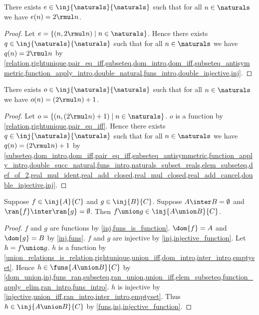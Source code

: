 \begin{lemma}\label{even_code_injection}
    There exists $e\in\inj{\naturals}{\naturals}$ such that
    for all $n\in\naturals$ we have $e(n)=2\rmul n$.
\end{lemma}
\begin{proof}
    Let $e=\{(n,2\rmul n)\mid n\in\naturals\}$.
    Hence there exists $q\in\inj{\naturals}{\naturals}$ such that
    for all $n\in\naturals$ we have $q(n)=2\rmul n$ by \cref{relation,rightunique,pair_eq_iff,subseteq,dom_intro,dom_iff,subseteq_antisymmetric,function_apply_intro,double_natural,funs_intro,double_injective,inj}.
\end{proof}

\begin{lemma}\label{odd_code_injection}
    There exists $o\in\inj{\naturals}{\naturals}$ such that
    for all $n\in\naturals$ we have $o(n)=(2\rmul n)+1$.
\end{lemma}
\begin{proof}
    Let $o=\{(n,(2\rmul n)+1)\mid n\in\naturals\}$.
    $o$ is a function by \cref{relation,rightunique,pair_eq_iff}.
    Hence there exists $q\in\inj{\naturals}{\naturals}$ such that
    for all $n\in\naturals$ we have $q(n)=(2\rmul n)+1$ by \cref{subseteq,dom_intro,dom_iff,pair_eq_iff,subseteq_antisymmetric,function_apply_intro,double_succ_natural,funs_intro,naturals_subset_reals,elem_subseteq,def_of_2,real_mul_ident,real_add_closed,real_mul_closed,real_add_cancel,double_injective,inj}.
\end{proof}

\begin{lemma}\label{union_inj_disjoint}
    Suppose $f\in\inj{A}{C}$ and $g\in\inj{B}{C}$.
    Suppose $A\inter B=\emptyset$ and $\ran{f}\inter\ran{g}=\emptyset$.
    Then $f\union g\in\inj{A\union B}{C}$.
\end{lemma}
\begin{proof}
    $f$ and $g$ are functions by \cref{inj,funs_is_function}.
    $\dom{f}=A$ and $\dom{g}=B$ by \cref{inj,funs}.
    $f$ and $g$ are injective by \cref{inj,injective_function}.
    Let $h=f\union g$.
    $h$ is a function by \cref{union_relations_is_relation,rightunique,union_iff,dom_intro,inter_intro,emptyset}.
    Hence $h\in\funs{A\union B}{C}$ by \cref{dom_union,inj,funs_ran,subseteq,ran_union,union_iff,elem_subseteq,function_apply_elim,ran_intro,funs_intro}.
    $h$ is injective by \cref{injective,union_iff,ran_intro,inter_intro,emptyset}.
    Thus $h\in\inj{A\union B}{C}$ by \cref{funs,inj,injective_function}.
\end{proof}

